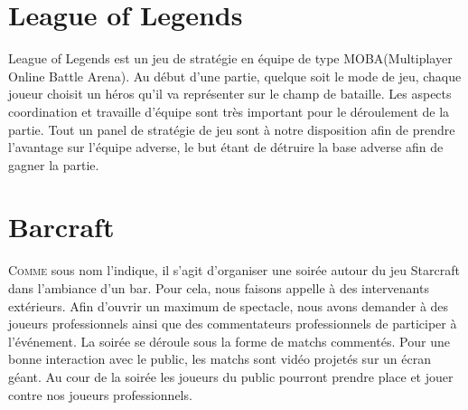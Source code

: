 
\section{League of Legends}%
\label{sec:league_of_legends}

League of Legends est un jeu de stratégie en équipe de type
MOBA(Multiplayer Online Battle Arena). Au début d'une partie, quelque
soit le mode de jeu, chaque joueur choisit un héros qu'il va représenter
sur le champ de bataille. Les aspects coordination et travaille d'équipe
sont très important pour le déroulement de la partie. Tout un panel de
stratégie de jeu sont à notre disposition afin de prendre l'avantage sur
l'équipe adverse, le but étant de détruire la base adverse afin de
gagner la partie.

\section{Barcraft}%
\label{sec:barcraft}

\lettrine{C}{omme} sous nom l'indique, il s'agit d'organiser une soirée
autour du jeu Starcraft dans l'ambiance d'un bar.	Pour cela, nous
faisons appelle à des intervenants extérieurs. Afin d'ouvrir un maximum
de spectacle, nous avons demander à des joueurs professionnels ainsi que
des commentateurs professionnels de participer à l'événement.  La soirée
se déroule sous la forme de matchs commentés. Pour une bonne interaction
avec le public, les matchs sont vidéo projetés sur un écran géant. Au
cour de la soirée les joueurs du public pourront prendre place et jouer
contre nos joueurs professionnels.

